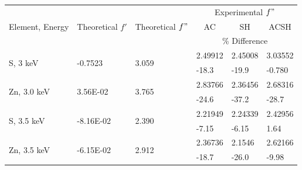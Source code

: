 \begin{table}[H]
{
\begin{tabular}{@{}llllll@{}}
\toprule
\multirow{3}{*}{Element, Energy} &
  \multirow{3}{*}{Theoretical $f'$} &
  \multirow{3}{*}{Theoretical $f"$} &
  \multicolumn{3}{c}{Experimental $f"$} \\
                             &                            &                           & \multicolumn{1}{c}{AC} & \multicolumn{1}{c}{SH} & \multicolumn{1}{c}{ACSH} \\ \cmidrule(l){4-6} 
                             &                            &                           & \multicolumn{3}{c}{\% Difference}                                          \\ \midrule
\multirow{2}{*}{S, 3 \unit{keV}}    & \multirow{2}{*}{-0.7523}  & \multirow{2}{*}{3.059} & 2.49912                & 2.45008                & 3.03552                  \\
                             &                            &                           & -18.3               & -19.9               & -0.780                 \\ \midrule
\multirow{2}{*}{Zn, 3.0 \unit{keV}} & \multirow{2}{*}{3.56E-02}  & \multirow{2}{*}{3.765} & 2.83766                & 2.36456                & 2.68316                  \\
                             &                            &                           & -24.6               & -37.2               & -28.7                 \\ \midrule
\multirow{2}{*}{S, 3.5 \unit{keV}}  & \multirow{2}{*}{-8.16E-02} & \multirow{2}{*}{2.390} & 2.21949                & 2.24339                & 2.42956                  \\
                             &                            &                           & -7.15               & -6.15               & 1.64                 \\ \midrule
\multirow{2}{*}{Zn, 3.5 \unit{keV}}  & \multirow{2}{*}{-6.15E-02} & \multirow{2}{*}{2.912} & 2.36736                & 2.1546                 & 2.62166                  \\
                             &                            &                           & -18.7               & -26.0               & -9.98                 \\ \bottomrule
\end{tabular}%
}


\end{table}
